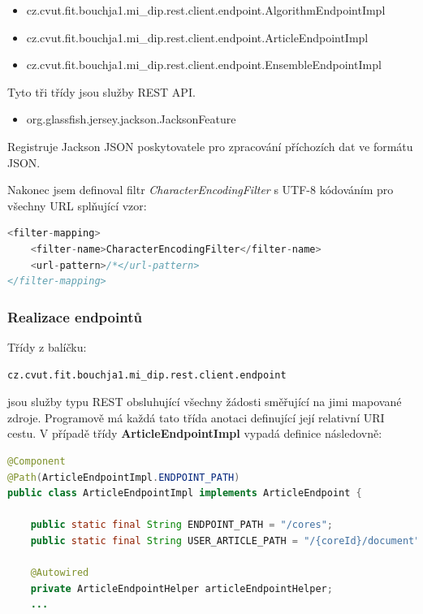 \documentclass[thesis=M,czech]{FITthesis}[2014/05/07]
\begin{document}
\begin{itemize}	
	\item cz.cvut.fit.bouchja1.mi\_dip.rest.client.endpoint.AlgorithmEndpointImpl
\end{itemize}	

\begin{itemize}
	\item cz.cvut.fit.bouchja1.mi\_dip.rest.client.endpoint.ArticleEndpointImpl
\end{itemize}	

\begin{itemize}
	\item cz.cvut.fit.bouchja1.mi\_dip.rest.client.endpoint.EnsembleEndpointImpl
\end{itemize}	

	Tyto tři třídy jsou služby REST API. 
	
\begin{itemize}	
	\item org.glassfish.jersey.jackson.JacksonFeature		
\end{itemize}	
	Registruje Jackson JSON poskytovatele pro zpracování příchozích dat ve formátu JSON.

Nakonec jsem definoval filtr \emph{CharacterEncodingFilter} s UTF-8 kódováním pro všechny URL splňující vzor:

\begin{lstlisting}[language=java]
<filter-mapping>
    <filter-name>CharacterEncodingFilter</filter-name>
    <url-pattern>/*</url-pattern>
</filter-mapping>    
\end{lstlisting}

\subsubsection{Realizace endpointů}
\label{sec:endpoints}
Třídy z balíčku:

\begin{verbatim}
cz.cvut.fit.bouchja1.mi_dip.rest.client.endpoint
\end{verbatim}

jsou služby typu REST obsluhující všechny žádosti směřující na jimi mapované zdroje. Programově má každá tato třída anotaci definující její relativní URI cestu. V případě třídy \textbf{ArticleEndpointImpl} vypadá definice následovně:

\begin{lstlisting}[language=java]
@Component
@Path(ArticleEndpointImpl.ENDPOINT_PATH)
public class ArticleEndpointImpl implements ArticleEndpoint {
    
    public static final String ENDPOINT_PATH = "/cores";
    public static final String USER_ARTICLE_PATH = "/{coreId}/document";

    @Autowired
    private ArticleEndpointHelper articleEndpointHelper;  	
    ...
\end{lstlisting}
\end{document}
